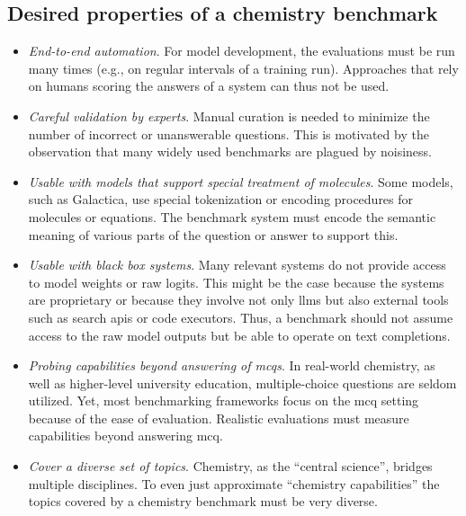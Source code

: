 
\subsection{Desired properties of a chemistry benchmark} \label{sec:desired-properties}

\begin{itemize}
    \item \emph{End-to-end automation}. For model development, the evaluations must be run many times (e.g., on regular intervals of a training run).
    Approaches that rely on humans scoring the answers of a system\autocite{Schulze_Balhorn_2024, ai4science2023impact, castro2023large} can thus not be used.
    \item \emph{Careful validation by experts}. Manual curation is needed to minimize the number of incorrect or unanswerable questions.\autocite{northcutt2021pervasive}
    This is motivated by the observation that many widely used benchmarks are plagued by noisiness.\autocite{Frye_2023, Awg}
    \item \emph{Usable with models that support special treatment of molecules}. Some models, such as Galactica\autocite{taylor2022galactica}, use special tokenization or encoding procedures for molecules or equations.
    The benchmark system must encode the semantic meaning of various parts of the question or answer to support this.
    \item \emph{Usable with black box systems}. Many relevant systems do not provide access to model weights or raw logits.
    This might be the case because the systems are proprietary or because they involve not only \glspl{llm} but also external tools such as search \glspl{api} or code executors.\autocite{schick2024toolformer, karpas2022mrkl, yao2022react}
    Thus, a benchmark should not assume access to the raw model outputs but be able to operate on text completions.
    \item \emph{Probing capabilities beyond answering of \glspl{mcq}}. In real-world chemistry, as well as higher-level university education, multiple-choice questions are seldom utilized.
    Yet, most benchmarking frameworks focus on the \gls{mcq} setting because of the ease of evaluation. Realistic evaluations must measure capabilities beyond answering \gls{mcq}.
    \item \emph{Cover a diverse set of topics}. Chemistry, as the \enquote{central science}, bridges multiple disciplines.\autocite{Aspuru_Guzik_2018} To even just approximate \enquote{chemistry capabilities} the topics covered by a chemistry benchmark must be very diverse.

\end{itemize}
